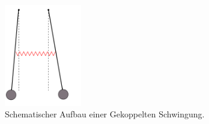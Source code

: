 \begin{figure}[h!]
    \centering
    \includegraphics[width=0.3\textwidth]{bilder/koppel.png}
    \caption{Schematischer Aufbau einer Gekoppelten Schwingung. \cite{skript}} 
    \label{fig:3}
\end{figure}

